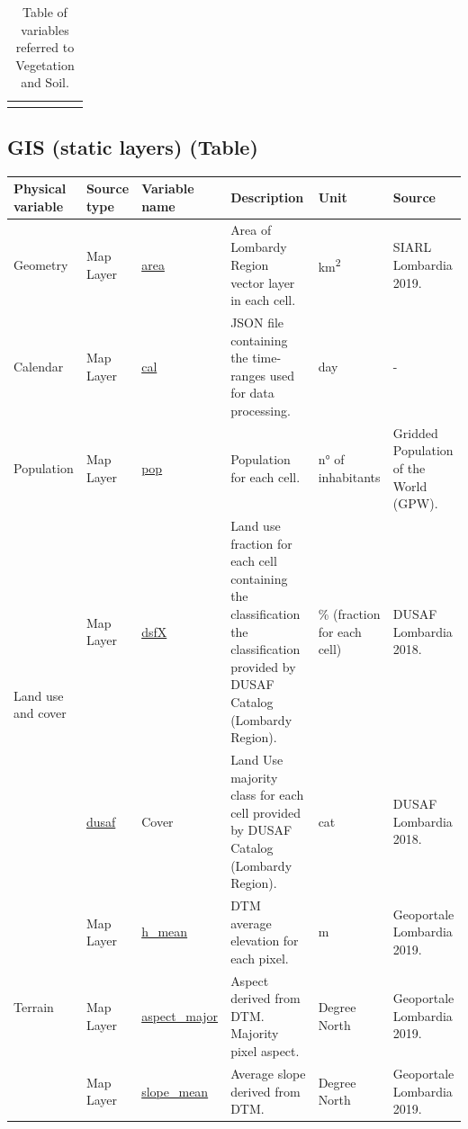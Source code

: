 \begin{center}
\begin{longtable}{ |p{2cm}|p{1.5cm}|p{2.3cm}|p{4cm}|p{1cm}|p{2cm}| }
\hline
\caption{Table of variables referred to Vegetation and Soil.}

\end{longtable}
\end{center}

\subsection{GIS (static layers) (Table)}

\begin{center}
\setlength{\arrayrulewidth}{1.5pt}
\begin{longtable}{ |p{2.1cm}|p{1.5cm}|p{2.3cm}|p{4cm}|p{1.5cm}|p{2cm}| } 
\hline
\textbf{Physical variable} & \textbf{Source type}  & \textbf{Variable name}  & \textbf{Description}  & \textbf{Unit}  & \textbf{Source}\\ 
\hline
\multirow{1}{4em}{Geometry} & Map Layer  & \underline{area} & Area of Lombardy Region vector layer in each cell. \par& km\textsuperscript{2} & SIARL Lombardia 2019.\\ 
\hline
\multirow{1}{4em}{Calendar} & Map Layer  & \underline{cal} & JSON file containing the time-ranges used for data processing. \par& day & -\\ 
\hline

\multirow{1}{4em}{Population} & Map Layer  & \underline{pop} & Population for each cell. & n° of inhabitants& Gridded Population of the World (GPW).\\ \hline

\multirow{2}{4em}{Land use and cover} & Map Layer  & \underline{dsfX} & Land use fraction for each cell containing the classification the classification provided by DUSAF Catalog (Lombardy Region). & \% (fraction for each cell) & DUSAF Lombardia 2018.\\ \hline
Map Layer  & \underline{dusaf} & Cover & Land Use majority class for each cell provided by DUSAF Catalog (Lombardy Region). & cat  & DUSAF Lombardia 2018.\\
\hline

\multirow{3}{4em}{Terrain} & Map Layer  & \underline{h\_mean} & DTM average elevation for each pixel. & m & Geoportale Lombardia 2019.\\ 
& Map Layer  & \underline{aspect\_major} & Aspect derived from DTM. Majority pixel aspect. & Degree North & Geoportale Lombardia 2019.\\ 
& Map Layer  & \underline{slope\_mean} & Average slope derived from DTM. & Degree North & Geoportale Lombardia 2019.\\ 


\end{longtable}
\end{center}
